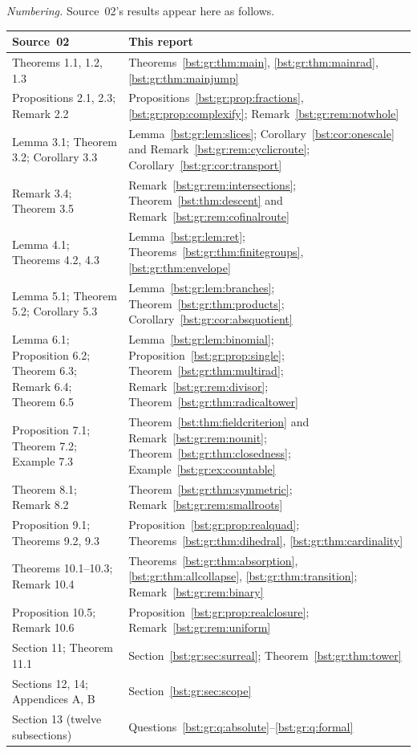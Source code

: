 \documentclass[11pt,letterpaper]{article}
\theoremstyle{definition}
\theoremstyle{remark}
\begin{document}
\emph{Numbering.} Source~02's results appear here as follows.

\begin{center}
\small
\begin{tabularx}{\textwidth}{@{}lX@{}}
\toprule
Source~02 & This report \\
\midrule
Theorems 1.1, 1.2, 1.3 & Theorems~\ref{bst:gr:thm:main}, \ref{bst:gr:thm:mainrad}, \ref{bst:gr:thm:mainjump} \\
Propositions 2.1, 2.3; Remark 2.2 & Propositions~\ref{bst:gr:prop:fractions}, \ref{bst:gr:prop:complexify}; Remark~\ref{bst:gr:rem:notwhole} \\
Lemma 3.1; Theorem 3.2; Corollary 3.3 & Lemma~\ref{bst:gr:lem:slices}; Corollary~\ref{bst:cor:onescale} and Remark~\ref{bst:gr:rem:cyclicroute}; Corollary~\ref{bst:gr:cor:transport} \\
Remark 3.4; Theorem 3.5 & Remark~\ref{bst:gr:rem:intersections}; Theorem~\ref{bst:thm:descent} and Remark~\ref{bst:gr:rem:cofinalroute} \\
Lemma 4.1; Theorems 4.2, 4.3 & Lemma~\ref{bst:gr:lem:ret}; Theorems~\ref{bst:gr:thm:finitegroups}, \ref{bst:gr:thm:envelope} \\
Lemma 5.1; Theorem 5.2; Corollary 5.3 & Lemma~\ref{bst:gr:lem:branches}; Theorem~\ref{bst:gr:thm:products}; Corollary~\ref{bst:gr:cor:absquotient} \\
Lemma 6.1; Proposition 6.2; Theorem 6.3; Remark 6.4; Theorem 6.5 & Lemma~\ref{bst:gr:lem:binomial}; Proposition~\ref{bst:gr:prop:single}; Theorem~\ref{bst:gr:thm:multirad}; Remark~\ref{bst:gr:rem:divisor}; Theorem~\ref{bst:gr:thm:radicaltower} \\
Proposition 7.1; Theorem 7.2; Example 7.3 & Theorem~\ref{bst:thm:fieldcriterion} and Remark~\ref{bst:gr:rem:nounit}; Theorem~\ref{bst:gr:thm:closedness}; Example~\ref{bst:gr:ex:countable} \\
Theorem 8.1; Remark 8.2 & Theorem~\ref{bst:gr:thm:symmetric}; Remark~\ref{bst:gr:rem:smallroots} \\
Proposition 9.1; Theorems 9.2, 9.3 & Proposition~\ref{bst:gr:prop:realquad}; Theorems~\ref{bst:gr:thm:dihedral}, \ref{bst:gr:thm:cardinality} \\
Theorems 10.1--10.3; Remark 10.4 & Theorems~\ref{bst:gr:thm:absorption}, \ref{bst:gr:thm:allcollapse}, \ref{bst:gr:thm:transition}; Remark~\ref{bst:gr:rem:binary} \\
Proposition 10.5; Remark 10.6 & Proposition~\ref{bst:gr:prop:realclosure}; Remark~\ref{bst:gr:rem:uniform} \\
Section 11; Theorem 11.1 & Section~\ref{bst:gr:sec:surreal}; Theorem~\ref{bst:gr:thm:tower} \\
Sections 12, 14; Appendices A, B & Section~\ref{bst:gr:sec:scope} \\
Section 13 (twelve subsections) & Questions~\ref{bst:gr:q:absolute}--\ref{bst:gr:q:formal} \\
\bottomrule
\end{tabularx}
\end{center}
\end{document}
